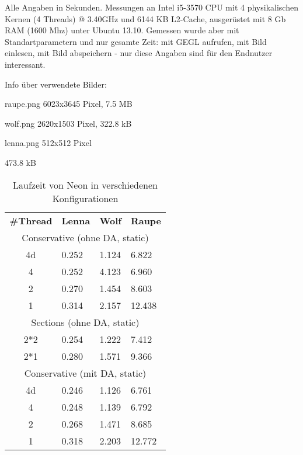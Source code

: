 Alle Angaben in Sekunden. Messungen an Intel i5-3570 CPU mit 4 physikalischen Kernen (4 Threads) @ 3.40GHz und 6144 KB L2-Cache, ausgerüstet mit 8 Gb RAM (1600 Mhz) unter Ubuntu 13.10. Gemessen wurde aber mit Standartparametern und nur gesamte Zeit: mit GEGL aufrufen, mit Bild einlesen, mit Bild abspeichern - nur diese Angaben sind für den Endnutzer interessant.

Info über verwendete Bilder:

raupe.png 6023x3645 Pixel, 7.5 MB

wolf.png 2620x1503 Pixel, 322.8 kB

lenna.png 512x512 Pixel
\begin{table}[h] 473.8 kB
\centering
\begin{tabular}{c p{2cm}p{2cm}p{2cm}}
\toprule
\textbf{\#Thread} & \textbf{Lenna} & \textbf{Wolf} & \textbf{Raupe} \\

\cmidrule(r){1-4}

\multicolumn{4}{c}{Conservative (ohne DA, static)} 	\\
4d 	& 0.252		&1.124		&6.822			\\
4 	& 0.252		&4.123		&6.960 		 	\\
2	& 0.270		&1.454		&8.603			\\
1	& 0.314		&2.157		&12.438 			\\

\cmidrule(r){1-4}

\multicolumn{4}{c}{Sections (ohne DA, static)} 		\\
2*2 	& 0.254		&1.222		&7.412 		 	\\
2*1	& 0.280		&1.571		&9.366 		 	\\

\cmidrule(r){1-4}

\multicolumn{4}{c}{Conservative (mit DA, static)}	\\
4d	& 0.246		& 1.126		& 6.761			\\
4 	& 0.248		&1.139		& 6.792		 	\\
2	& 0.268		&1.471		& 8.685 		 	\\
1	& 0.318		&2.203		&12.772			\\

\bottomrule
\end{tabular}
\caption{Laufzeit von Neon in verschiedenen Konfigurationen}
\label{tab:NEON_runtime}
\end{table}

